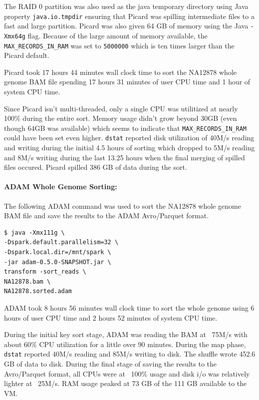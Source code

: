 \documentclass[10pt,twocolumn]{article}
\theoremstyle{plain}
\begin{document}
The RAID 0 partition was also used as the java temporary directory using Java property
\texttt{java.io.tmpdir} ensuring that Picard was spilling intermediate files to a fast and large partition.
Picard was also given 64 GB of memory using the Java \texttt{-Xmx64g} flag. Because of the large amount of memory available,
the \texttt{MAX\_RECORDS\_IN\_RAM} was set to \texttt{5000000} which is ten times larger than the Picard default.

Picard took 17 hours 44 minutes wall clock time to sort the NA12878 whole genome BAM file spending 17 hours 31 minutes of user CPU time and
1 hour of system CPU time.

Since Picard isn't multi-threaded, only a
single CPU was utilitized at nearly 100\% during the entire sort. Memory usage didn't grow beyond 30GB (even
though 64GB was available) which seems to indicate that \texttt{MAX\_RECORDS\_IN\_RAM} could have been set even higher.
\texttt{dstat} reported disk utilization of 40M/s reading and writing during the initial 4.5 hours of sorting which
dropped to 5M/s reading and 8M/s writing during the last 13.25 hours when the final merging of spilled files occured.
Picard spilled 386 GB of data during the sort.

\paragraph{ADAM Whole Genome Sorting:}
\label{sec:single-sort-adam}

The following ADAM command was used to sort the NA12878 whole genome BAM file and save the results to the 
ADAM Avro/Parquet format.

\begin{lstlisting}
$ java -Xmx111g \
-Dspark.default.parallelism=32 \
-Dspark.local.dir=/mnt/spark \
-jar adam-0.5.0-SNAPSHOT.jar \
transform -sort_reads \
NA12878.bam \
NA12878.sorted.adam
\end{lstlisting}

ADAM took 8 hours 56 minutes wall clock time to sort the whole genome using 6 hours of user CPU time and 2 hours 52 minutes of 
system CPU time. 

During the initial key sort stage, ADAM was reading the BAM at ~75M/s with about 60\% CPU utilization for a little over
90 minutes. During the map phase, \texttt{dstat} reported 40M/s reading and 85M/s writing to disk. The shuffle wrote
452.6 GB of data to disk. During the final stage of saving the results to the Avro/Parquet format, all CPUs were at
~100\% usage and disk i/o was relatively lighter at ~25M/s. RAM usage peaked at 73 GB of the 111 GB available to the VM.
\end{document}
